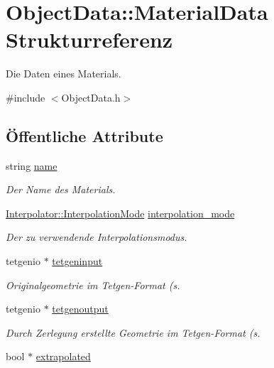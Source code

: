 \hypertarget{structObjectData_1_1MaterialData}{\section{Object\-Data\-:\-:Material\-Data Strukturreferenz}
\label{structObjectData_1_1MaterialData}
}


Die Daten eines Materials.  




{\ttfamily \#include $<$Object\-Data.\-h$>$}

\subsection*{Öffentliche Attribute}
\begin{DoxyCompactItemize}
\item 
string \hyperlink{structObjectData_1_1MaterialData_a795f1265218b9a125559bbe9231f3c8d}{name}
\begin{DoxyCompactList}\small\item\em Der Name des Materials. \end{DoxyCompactList}\item 
\hyperlink{classInterpolator_adb733b1439a2903feae57fa734ced0c2}{Interpolator\-::\-Interpolation\-Mode} \hyperlink{structObjectData_1_1MaterialData_a35d4f03b3af4349f69d5fed072118dca}{interpolation\-\_\-mode}
\begin{DoxyCompactList}\small\item\em Der zu verwendende Interpolationsmodus. \end{DoxyCompactList}\item 
tetgenio $\ast$ \hyperlink{structObjectData_1_1MaterialData_ab752395b4aedbe011fa49de7fbbd36ee}{tetgeninput}
\begin{DoxyCompactList}\small\item\em Originalgeometrie im Tetgen-\/\-Format (s. \end{DoxyCompactList}\item 
tetgenio $\ast$ \hyperlink{structObjectData_1_1MaterialData_a15d576cfe25abe334e34eb5e4671d6d7}{tetgenoutput}
\begin{DoxyCompactList}\small\item\em Durch Zerlegung erstellte Geometrie im Tetgen-\/\-Format (s. \end{DoxyCompactList}\item 
bool $\ast$ \hyperlink{structObjectData_1_1MaterialData_a22bff8a90f617a5485690bd017dcf701}{extrapolated}

\end{DoxyCompactItemize}

